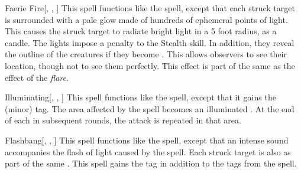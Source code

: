 \lowercase{\hypertarget{spell:Faerie Fire}{}}\label{spell:Faerie Fire}
\begin{freeability}[\nth{2}]{\hypertarget{spell:Faerie Fire}{Faerie Fire}}[, , ]
This spell functions like the  spell, except that each struck target is surrounded with a pale glow made of hundreds of ephemeral points of light.
This causes the struck target to radiate bright light in a 5 foot radius, as a candle.
The lights impose a  penalty to the Stealth skill.
In addition, they reveal the outline of the creatures if they become .
This allows observers to see their location, though not to see them perfectly.
This effect is part of the same  as the effect of the \textit{flare}.
\end{freeability}
\vspace{0.25em}



\lowercase{\hypertarget{spell:Illuminating}{}}\label{spell:Illuminating}
\begin{freeability}[\nth{2}]{\hypertarget{spell:Illuminating}{Illuminating}}[, , ]
This spell functions like the  spell, except that it gains the  (minor) tag.
The area affected by the spell becomes an illuminated .
At the end of each  in subsequent rounds, the attack is repeated in that area.
\end{freeability}
\vspace{0.25em}



\lowercase{\hypertarget{spell:Flashbang}{}}\label{spell:Flashbang}
\begin{freeability}[\nth{3}]{\hypertarget{spell:Flashbang}{Flashbang}}[, , ]
This spell functions like the  spell, except that an intense sound accompanies the flash of light caused by the spell.
Each struck target is also  as part of the same .
This spell gains the  tag in addition to the tags from the  spell.
\end{freeability}
\vspace{0.25em}



